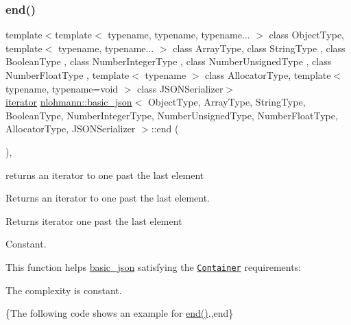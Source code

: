 \subsubsection{\texorpdfstring{end()}{end()}\hspace{0.1cm}{\footnotesize\ttfamily [1/2]}}
{\footnotesize\ttfamily template$<$template$<$ typename, typename, typename... $>$ class Object\+Type, template$<$ typename, typename... $>$ class Array\+Type, class String\+Type , class Boolean\+Type , class Number\+Integer\+Type , class Number\+Unsigned\+Type , class Number\+Float\+Type , template$<$ typename $>$ class Allocator\+Type, template$<$ typename, typename=void $>$ class J\+S\+O\+N\+Serializer$>$ \\
\hyperlink{classnlohmann_1_1basic__json_a099316232c76c034030a38faa6e34dca}{iterator} \hyperlink{classnlohmann_1_1basic__json}{nlohmann\+::basic\+\_\+json}$<$ Object\+Type, Array\+Type, String\+Type, Boolean\+Type, Number\+Integer\+Type, Number\+Unsigned\+Type, Number\+Float\+Type, Allocator\+Type, J\+S\+O\+N\+Serializer $>$\+::end (\begin{DoxyParamCaption}{ }\end{DoxyParamCaption})\hspace{0.3cm}{\ttfamily [inline]}, {\ttfamily [noexcept]}}



returns an iterator to one past the last element 

Returns an iterator to one past the last element.

 \begin{DoxyReturn}{Returns}
iterator one past the last element
\end{DoxyReturn}
Constant.

This function helps {\ttfamily \hyperlink{classnlohmann_1_1basic__json}{basic\+\_\+json}} satisfying the \href{http://en.cppreference.com/w/cpp/concept/Container}{\tt Container} requirements\+:
\begin{DoxyItemize}
\item The complexity is constant.
\end{DoxyItemize}

\{The following code shows an example for {\ttfamily \hyperlink{classnlohmann_1_1basic__json_a13e032a02a7fd8a93fdddc2fcbc4763c}{end()}}.,end\}

